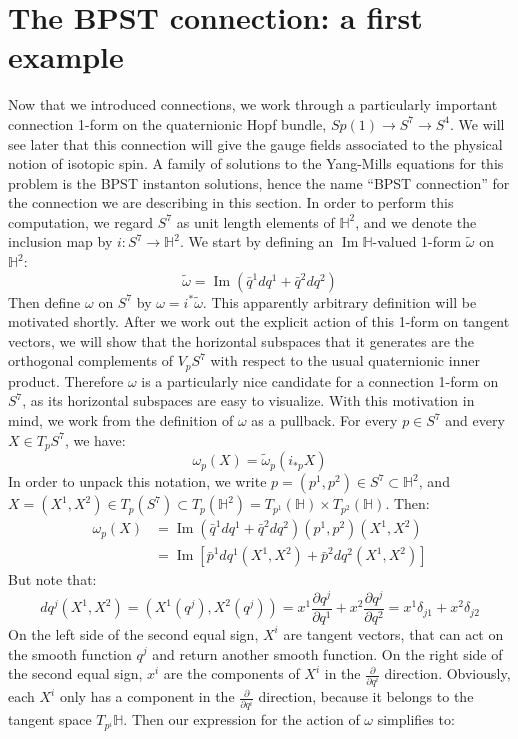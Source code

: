 \documentclass{book}
\newcommand{\HH}{\mathbb{H}}
\newcommand{\p}{\partial}
\DeclareMathOperator{\Imag}{Im}
\theoremstyle{plain}
\theoremstyle{definition}
\theoremstyle{remark}
\begin{document}
\section{The BPST connection: a first example}
Now that we introduced connections, we work through a particularly important connection 1-form on the quaternionic Hopf bundle, $Sp(1) \to S^7 \to S^4$. We will see later that this connection will give the gauge fields associated to the physical notion of isotopic spin. A family of solutions to the Yang-Mills equations for this problem is the BPST instanton solutions, hence the name ``BPST connection'' for the connection we are describing in this section. In order to perform this computation, we regard $S^7$ as unit length elements of $\HH^2$, and we denote the inclusion map by $i : S^7 \to \HH^2$. We start by defining an $\Imag \HH$-valued 1-form $\tilde \omega$ on $\HH^2$:
\[      \tilde \omega = \Imag(\bar q^1 dq^1 + \bar q^2 dq^2)     \]
Then define $\omega$ on $S^7$ by $\omega = i^* \tilde \omega$. This apparently arbitrary definition will be motivated shortly. After we work out the explicit action of this 1-form on tangent vectors, we will show that the horizontal subspaces that it generates are the orthogonal complements of $V_p S^7$ with respect to the usual quaternionic inner product. Therefore $\omega$ is a particularly nice candidate for a connection 1-form on $S^7$, as its horizontal subspaces are easy to visualize. With this motivation in mind, we work from the definition of $\omega$ as a pullback. For every $p \in S^7$ and every $X \in T_p S^7$, we have:
\[     \omega_p (X) = \tilde \omega_p (i_{*p} X)    \]
In order to unpack this notation, we write $p = (p^1, p^2) \in S^7 \subset \HH^2$, and $X = (X^1, X^2) \in T_p(S^7) \subset T_p(\HH^2) = T_{p^1} (\HH) \times T_{p^2} (\HH)$. Then:
\begin{align*}
\omega_p(X) &= \Imag(\bar q^1 dq^1 + \bar q^2 dq^2)(p^1, p^2)(X^1, X^2)  \\
&= \Imag[\bar p^1 dq^1(X^1, X^2) + \bar p^2 dq^2(X^1, X^2)] 
\end{align*}
But note that:
\[   dq^j(X^1, X^2) = (X^1(q^j), X^2(q^j)) = x^1 \frac{\p q^j}{\p q^1} + x^2 \frac{\p q^j}{\p q^2} = x^1 \delta_{j1} + x^2 \delta_{j2} \]
On the left side of the second equal sign, $X^i$ are tangent vectors, that can act on the smooth function $q^j$ and return another smooth function. On the right side of the second equal sign, $x^i$ are the components of $X^i$ in the $\frac{\p}{\p q^i}$ direction. Obviously, each $X^i$ only has a component in the $\frac{\p}{\p q^i}$ direction, because it belongs to the tangent space $T_{p^i}\HH$. Then our expression for the action of $\omega$ simplifies to:
\end{document}

